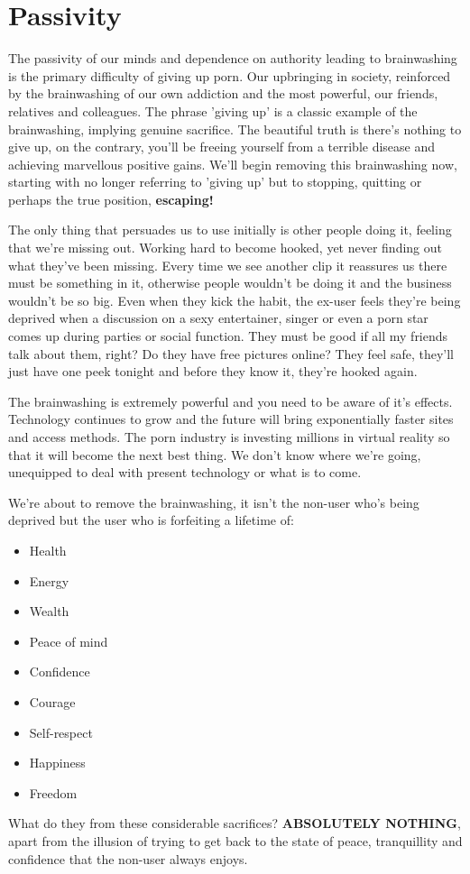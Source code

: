 \documentclass[easypeasy.tex]{subfiles}
\begin{document}
\section{Passivity}
The passivity of our minds and dependence on authority leading to brainwashing is the primary difficulty of giving up porn. Our upbringing in society, reinforced by the brainwashing of our own addiction and the most powerful, our friends, relatives and colleagues. The phrase 'giving up' is a classic example of the brainwashing, implying genuine sacrifice. The beautiful truth is there's nothing to give up, on the contrary, you'll be freeing yourself from a terrible disease and achieving marvellous positive gains. We'll begin removing this brainwashing now, starting with no longer referring to 'giving up' but to stopping, quitting or perhaps the true position, \textbf{escaping!}

The only thing that persuades us to use initially is other people doing it, feeling that we're missing out. Working hard to become hooked, yet never finding out what they've been missing. Every time we see another clip it reassures us there must be something in it, otherwise people wouldn't be doing it and the business wouldn't be so big. Even when they kick the habit, the ex-user feels they're being deprived when a discussion on a sexy entertainer, singer or even a porn star comes up during parties or social function. They must be good if all my friends talk about them, right? Do they have free pictures online? They feel safe, they'll just have one peek tonight and before they know it, they're hooked again.

The brainwashing is extremely powerful and you need to be aware of it's effects. Technology continues to grow and the future will bring exponentially faster sites and access methods. The porn industry is investing millions in virtual reality so that it will become the next best thing. We don't know where we're going, unequipped to deal with present technology or what is to come.

We're about to remove the brainwashing, it isn't the non-user who's being deprived but the user who is forfeiting a lifetime of:
\begin{itemize}
  \item Health
  \item Energy
  \item Wealth
  \item Peace of mind
  \item Confidence
  \item Courage
  \item Self-respect
  \item Happiness
  \item Freedom
\end{itemize}
What do they from these considerable sacrifices? \textbf{ABSOLUTELY NOTHING}, apart from the illusion of trying to get back to the state of peace, tranquillity and confidence that the non-user always enjoys.
\end{document}
